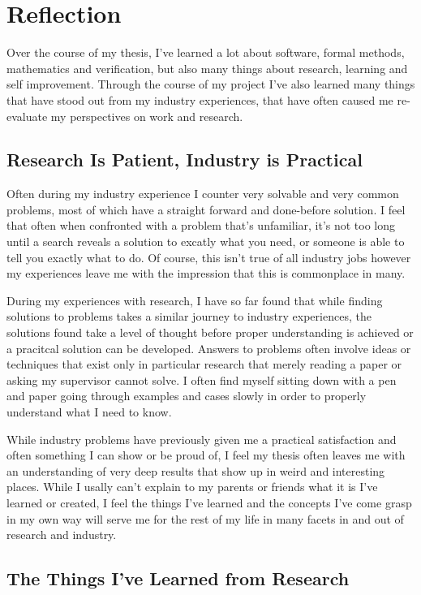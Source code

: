 \chapter{Reflection}\label{ch:reflection}

Over the course of my thesis, I've learned a lot about software, formal methods, mathematics and verification, but also
many things about research, learning and self improvement. Through the course of my project I've also learned many things
that have stood out from my industry experiences, that have often caused me re-evaluate my perspectives on work and research.

\section{Research Is Patient, Industry is Practical}

Often during my industry experience I counter very solvable and very common problems, most of which have a straight forward
and done-before solution. I feel that often when confronted with a problem that's unfamiliar, it's not too long until
a search reveals a solution to excatly what you need, or someone is able to tell you exactly what to do. Of course,
this isn't true of all industry jobs however my experiences leave me with the impression that this is commonplace in many.

During my experiences with research, I have so far found that while finding solutions to problems takes a similar journey
to industry experiences, the solutions found take a level of thought before proper understanding is achieved or a pracitcal
solution can be developed. Answers to problems often involve ideas or techniques that exist only in particular research
that merely reading a paper or asking my supervisor cannot solve. I often find myself sitting down with a pen and paper
going through examples and cases slowly in order to properly understand what I need to know.

While industry problems have previously given me a practical satisfaction and often something I can show or be proud of,
I feel my thesis often leaves me with an understanding of very deep results that show up in weird and interesting places.
While I usally can't explain to my parents or friends what it is I've learned or created, I feel the things I've learned and
the concepts I've come grasp in my own way will serve me for the rest of my life in many facets in and out of research and
industry.

\section{The Things I've Learned from Research}

